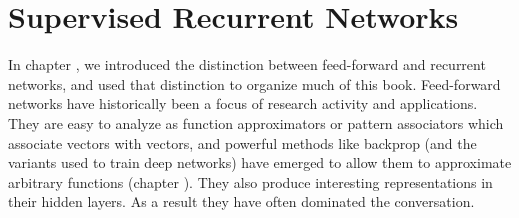 \chapter{Supervised Recurrent Networks}\label{ch_supervised_recurrent}


In chapter , we introduced the distinction between feed-forward and recurrent networks, and used that distinction to organize much of this book. Feed-forward networks have historically been a focus of research activity and applications. They are easy to analyze as function approximators or pattern associators which  associate vectors with vectors, and powerful methods like backprop (and the variants used to train deep networks) have emerged to allow them to approximate arbitrary functions (chapter ). They also produce interesting representations in their hidden layers. As a result they have often dominated the conversation.


